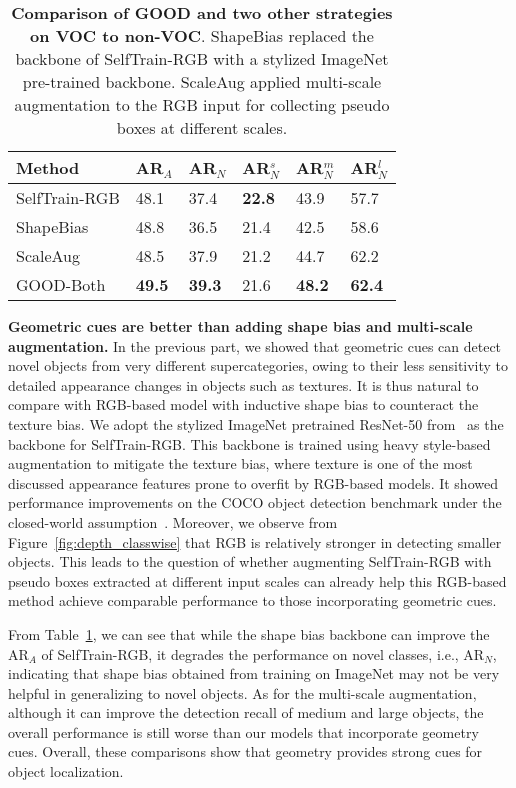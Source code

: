 \documentclass{article} \usepackage{iclr2023_conference,times}
\begin{document}
\begin{table}
    \caption{\textbf{Comparison of GOOD and two other strategies on VOC to non-VOC}. ShapeBias replaced the backbone of SelfTrain-RGB with a stylized ImageNet pre-trained backbone. ScaleAug applied multi-scale augmentation to the RGB input for collecting pseudo boxes at different scales.}
\begin{tabular}{l|l|l|l|l|l}
						\toprule
						Method &  AR$_A$ & AR$_N$ & AR$_N^s$ & AR$_N^m$ & AR$_N^l$  \\ \midrule
                            SelfTrain-RGB & 48.1 & 37.4   &\textbf{22.8}  & 43.9 & 57.7 \\ \midrule
                             ShapeBias  & 48.8 & 36.5 & 21.4 & 42.5 & 58.6 \\
                             ScaleAug & 48.5 & 37.9 & 21.2 & 44.7 & 62.2\\
                             GOOD-Both & \textbf{49.5}  & \textbf{39.3} & 21.6 & \textbf{48.2} & \textbf{62.4}  \\
                    \bottomrule
						\end{tabular}


	\label{table:generalization_comparison}\vspace{-0.2em}
\end{table}
\textbf{Geometric cues are better than adding shape bias and multi-scale augmentation.}
In the previous part, we showed that geometric cues can detect novel objects from very different supercategories, owing to their less sensitivity to detailed appearance changes in objects such as textures. It is thus natural to compare with RGB-based model with inductive shape bias to counteract the texture bias. We adopt the stylized ImageNet pretrained ResNet-50 from~\citep{geirhos2018} as the backbone for SelfTrain-RGB. This backbone is trained using heavy style-based augmentation to mitigate the texture bias, where texture is one of the most discussed appearance features prone to overfit by RGB-based models. It showed performance improvements on the COCO object detection benchmark under the closed-world assumption~\citep{geirhos2018}.
Moreover, we observe from Figure~\ref{fig:depth_classwise} that RGB is relatively stronger in detecting smaller objects. This leads to the question of whether augmenting SelfTrain-RGB with pseudo boxes extracted at different input scales can already help this RGB-based method achieve comparable performance to those incorporating geometric cues.

From Table~\ref{table:generalization_comparison}, we can see that while the shape bias backbone can improve the AR$_A$ of SelfTrain-RGB, it degrades the performance on novel classes, i.e., AR$_N$, indicating that shape bias obtained from training on ImageNet may not be very helpful in generalizing to novel objects. As for the multi-scale augmentation, although it can improve the detection recall of medium and large objects, the overall performance is still worse than our models that incorporate geometry cues. Overall, these comparisons show that geometry provides strong cues for object localization.
\end{document}
